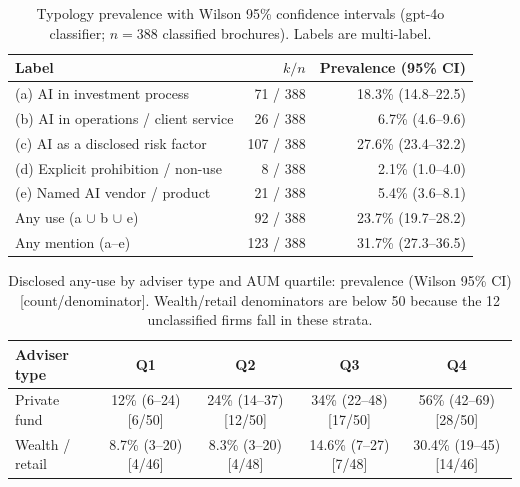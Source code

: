 \documentclass[utf8]{FrontiersinHarvard}
\begin{document}
\begin{table}[h!]
\caption{Typology prevalence with Wilson 95\% confidence intervals (gpt-4o classifier; $n = 388$ classified brochures). Labels are multi-label.}
\label{tab:typology}
\centering
\begin{tabular}{lrr}
\toprule
Label & $k / n$ & Prevalence (95\% CI) \\
\midrule
(a) AI in investment process & 71 / 388 & 18.3\% (14.8--22.5) \\
(b) AI in operations / client service & 26 / 388 & 6.7\% (4.6--9.6) \\
(c) AI as a disclosed risk factor & 107 / 388 & 27.6\% (23.4--32.2) \\
(d) Explicit prohibition / non-use & 8 / 388 & 2.1\% (1.0--4.0) \\
(e) Named AI vendor / product & 21 / 388 & 5.4\% (3.6--8.1) \\
Any use (a $\cup$ b $\cup$ e) & 92 / 388 & 23.7\% (19.7--28.2) \\
Any mention (a--e) & 123 / 388 & 31.7\% (27.3--36.5) \\
\bottomrule
\end{tabular}
\end{table}

\begin{table}[h!]
\caption{Disclosed any-use by adviser type and AUM quartile: prevalence (Wilson 95\% CI) [count/denominator]. Wealth/retail denominators are below 50 because the 12 unclassified firms fall in these strata.}
\label{tab:gradient}
\centering
\small
\begin{tabular}{lcccc}
\toprule
Adviser type & Q1 & Q2 & Q3 & Q4 \\
\midrule
Private fund & 12\% (6--24) [6/50] & 24\% (14--37) [12/50] & 34\% (22--48) [17/50] & 56\% (42--69) [28/50] \\
Wealth / retail & 8.7\% (3--20) [4/46] & 8.3\% (3--20) [4/48] & 14.6\% (7--27) [7/48] & 30.4\% (19--45) [14/46] \\
\bottomrule
\end{tabular}
\end{table}
\end{document}
